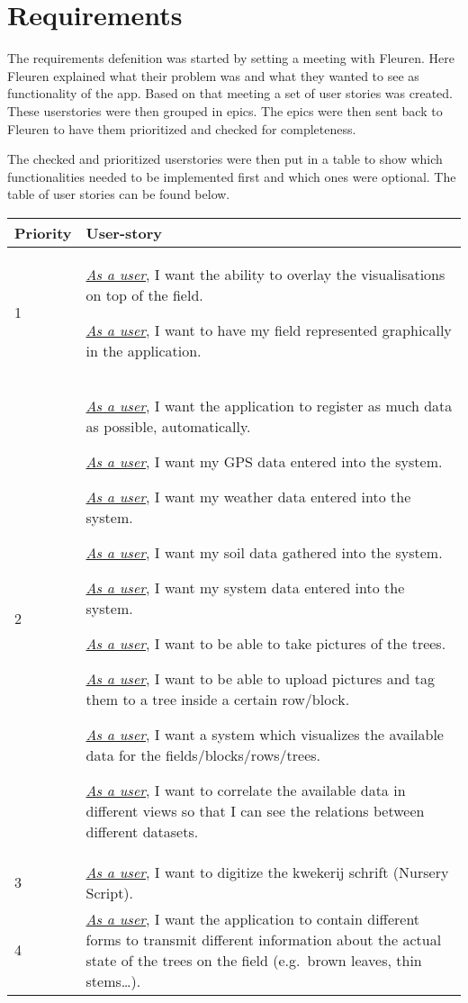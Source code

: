 \section{Requirements}
The requirements defenition was started by setting a meeting with Fleuren. Here Fleuren explained what their problem was and what they wanted to see as functionality of the app. Based on that meeting a set of user stories was created. These userstories were then grouped in epics. The epics were then sent back to Fleuren to have them prioritized and checked for completeness.

The checked and prioritized userstories were then put in a table to show which functionalities needed to be implemented first and which ones were optional. The table of user stories can be found below.

\begin{tabular}{| p{} | p{} |}
	\hline
	Priority & User-story \\
	\hline
	1 & \underline{\textit{As a user}}, I want the ability to overlay the visualisations on top of the field. 
	
	\underline{\textit{As a user}}, I want to have my field represented graphically in the application. \\
	\hline
	2 & \underline{\textit{As a user}}, I want the application to register as much data as possible, automatically.
	
	\underline{\textit{As a user}}, I want my GPS data entered into the system.
	
	\underline{\textit{As a user}}, I want my weather data entered into the system.
	
	\underline{\textit{As a user}}, I want my soil data gathered into the system.
	
	\underline{\textit{As a user}}, I want my system data entered into the system.
	
	\underline{\textit{As a user}}, I want to be able to take pictures of the trees.
	
	\underline{\textit{As a user}}, I want to be able to upload pictures and tag them to a tree inside a certain row/block.
	
	\underline{\textit{As a user}}, I want a system which visualizes the available data for the fields/blocks/rows/trees.
	
	\underline{\textit{As a user}}, I want to correlate the available data in different views so that I can see the relations between different datasets. \\
	\hline
	3 & \underline{\textit{As a user}}, I want to digitize the kwekerij schrift (Nursery Script). \\
	\hline
	4 & \underline{\textit{As a user}}, I want the application to contain different forms to transmit different information about the actual state of the trees on the field (e.g.~brown leaves, thin stems\ldots{}).
	

\end{tabular}

